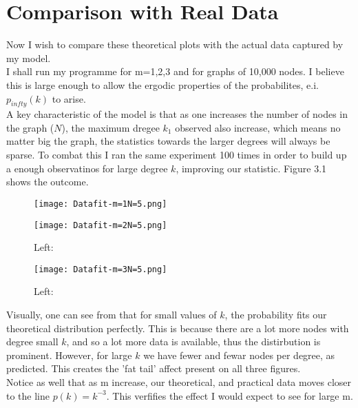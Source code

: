 \documentclass[]{article}
\begin{document}
\section{Comparison with Real Data}
Now I wish to compare these theoretical plots with the actual data captured by my model.\\
I shall run my programme for m=1,2,3 and for graphs of 10,000 nodes. I believe this is large enough to allow the ergodic properties of the probabilites, e.i. $p_{infty}(k)$ to arise.\\
 A key characteristic of the model is that as one increases the number of nodes in the graph ($N$), the maximum dregee $k_1$ observed also increase, which means no matter big the graph, the statistics towards the larger degrees will always be sparse. To combat this I ran the same experiment 100 times in order to build up a enough observatinos for large degree $k$, improving our statistic. Figure 3.1 shows the outcome. 
 \begin{figure}[htp]
 	\centering
 	\texttt{[image: Datafit-m=1N=5.png]}
 	\caption{\textit{}}
 \end{figure}
 \begin{figure}[htp]
 	\centering
 	
 	\texttt{[image: Datafit-m=2N=5.png]}
 	\caption{Left: \textit{}}
 \end{figure} 
 \begin{figure}[htp]
 	\centering
 	
 	\texttt{[image: Datafit-m=3N=5.png]}
 	\caption{Left: \textit{}}
 \end{figure}  
Visually, one can see from that for small values of $k$, the probability fits our theoretical distribution perfectly. This is because there are a lot more nodes with degree small $k$, and so a lot more data is available, thus the distirbution is prominent. However, for large $k$ we have fewer and fewar nodes per degree, as predicted. This creates the 'fat tail' affect present on all three figures. \\
Notice as well that as m increase, our theoretical, and practical data moves closer to the line $p(k)=k^{-3}$. This verfifies the effect I would expect to see for large m.
\end{document}
